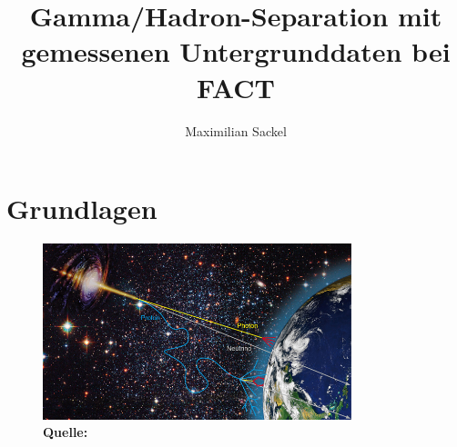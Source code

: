 \documentclass[aspectratio=1610, professionalfonts, 9pt]{beamer}
\title{Gamma/Hadron-Separation mit gemessenen Untergrunddaten bei FACT}
\author[M.~Sackel]{Maximilian Sackel}
\institute[Experimentelle Physik 5b]{Experimentelle Physik 5b \\  Astroteilchenphysik}
\begin{document}
\maketitle

\section{Grundlagen}
\begin{frame}
  \begin{figure}
	\centering
	\includegraphics[width=0.8\textwidth]{./images/sources-detection.jpg} \\
	{\tiny \textbf{Quelle:} \cite{Overview}}
  \end{figure}
\end{frame}
\end{document}
